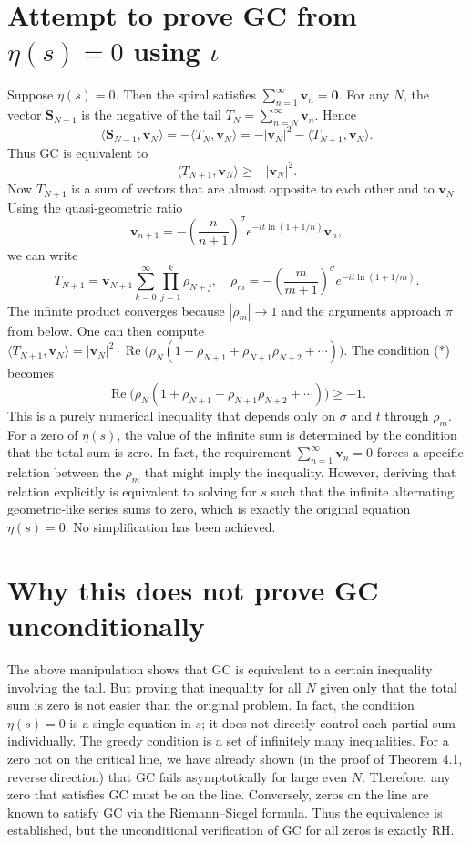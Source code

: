 \documentclass[12pt,a4paper]{article}
\begin{document}
\section{Attempt to prove GC from \(\eta(s)=0\) using \(\iota\)}

Suppose \(\eta(s)=0\). Then the spiral satisfies \(\sum_{n=1}^{\infty} \mathbf{v}_n = \mathbf{0}\). For any \(N\), the vector \(\mathbf{S}_{N-1}\) is the negative of the tail \(T_N = \sum_{n=N}^{\infty} \mathbf{v}_n\). Hence
\[
\langle \mathbf{S}_{N-1},\mathbf{v}_N \rangle = -\langle T_N,\mathbf{v}_N \rangle = -|\mathbf{v}_N|^2 - \langle T_{N+1},\mathbf{v}_N \rangle.
\]
Thus GC is equivalent to
\[
\langle T_{N+1},\mathbf{v}_N \rangle \ge -|\mathbf{v}_N|^2. \tag{*}
\]
Now \(T_{N+1}\) is a sum of vectors that are almost opposite to each other and to \(\mathbf{v}_N\). Using the quasi‑geometric ratio
\[
\mathbf{v}_{n+1} = -\left(\frac{n}{n+1}\right)^{\sigma} e^{-i t\ln(1+1/n)} \mathbf{v}_n,
\]
we can write
\[
T_{N+1} = \mathbf{v}_{N+1} \sum_{k=0}^{\infty} \prod_{j=1}^{k} \rho_{N+j},\quad
\rho_{m} = -\left(\frac{m}{m+1}\right)^{\sigma} e^{-i t\ln(1+1/m)}.
\]
The infinite product converges because \(|\rho_m| \to 1\) and the arguments approach \(\pi\) from below. One can then compute \(\langle T_{N+1},\mathbf{v}_N \rangle = |\mathbf{v}_N|^2 \cdot \operatorname{Re}\bigl( \rho_N (1 + \rho_{N+1} + \rho_{N+1}\rho_{N+2} + \cdots ) \bigr)\). The condition (*) becomes
\[
\operatorname{Re}\bigl( \rho_N (1 + \rho_{N+1} + \rho_{N+1}\rho_{N+2} + \cdots ) \bigr) \ge -1.
\]
This is a purely numerical inequality that depends only on \(\sigma\) and \(t\) through \(\rho_m\). For a zero of \(\eta(s)\), the value of the infinite sum is determined by the condition that the total sum is zero. In fact, the requirement \(\sum_{n=1}^{\infty} \mathbf{v}_n = 0\) forces a specific relation between the \(\rho_m\) that might imply the inequality. However, deriving that relation explicitly is equivalent to solving for \(s\) such that the infinite alternating geometric‑like series sums to zero, which is exactly the original equation \(\eta(s)=0\). No simplification has been achieved.

\section{Why this does not prove GC unconditionally}

The above manipulation shows that GC is equivalent to a certain inequality involving the tail. But proving that inequality for all \(N\) given only that the total sum is zero is not easier than the original problem. In fact, the condition \(\eta(s)=0\) is a single equation in \(s\); it does not directly control each partial sum individually. The greedy condition is a set of infinitely many inequalities. For a zero not on the critical line, we have already shown (in the proof of Theorem 4.1, reverse direction) that GC fails asymptotically for large even \(N\). Therefore, any zero that satisfies GC must be on the line. Conversely, zeros on the line are known to satisfy GC via the Riemann–Siegel formula. Thus the equivalence is established, but the unconditional verification of GC for all zeros is exactly RH.
\end{document}
